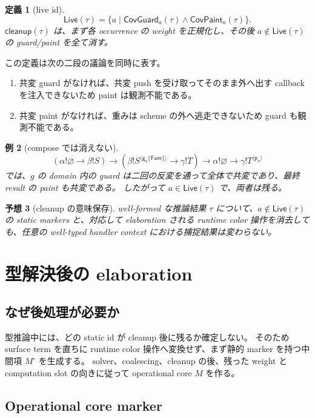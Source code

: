 \documentclass[uplatex,dvipdfmx,a4paper,11pt]{jsarticle}
\theoremstyle{jpplain}
\newtheorem{definition}{定義}[section]
\newtheorem{conjecture}[definition]{予想}
\newtheorem{example}[definition]{例}
\newcommand{\Fam}{\mathsf{Fam}}
\newcommand{\eff}{\mathbin{!}}
\newcommand{\emptyrow}{\varnothing}
\newcommand{\gatom}[2]{\mathsf g_{#1}\!\{#2\}}
\newcommand{\patom}[1]{\mathsf p_{#1}}
\newcommand{\wocc}[2]{#1^{\langle #2\rangle}}
\newcommand{\cleanup}{\mathsf{cleanup}}
\newcommand{\CovG}{\mathsf{CovGuard}}
\newcommand{\CovP}{\mathsf{CovPaint}}
\newcommand{\Live}{\mathsf{Live}}
\begin{document}
\begin{definition}[live id]
\[
  \Live(\tau)=\{a\mid \CovG_a(\tau)\land\CovP_a(\tau)\}.
\]
$\cleanup(\tau)$ は、まず各 occurrence の weight を正規化し、その後
$a\notin\Live(\tau)$ の guard/paint を全て消す。
\end{definition}

この定義は次の二段の議論を同時に表す。
\begin{enumerate}
  \item 共変 guard がなければ、共変 push を受け取ってそのまま外へ出す callback を注入できないため paint は観測不能である。
  \item 共変 paint がなければ、重みは scheme の外へ逃走できないため guard も観測不能である。
\end{enumerate}

\begin{example}[compose では消えない]
\[
 (\alpha\eff\emptyrow\to\beta\eff S)
 \to
 (\beta\eff\wocc S{\gatom a\Fam}\to\gamma\eff T)
 \to
 \alpha\eff\emptyrow\to\gamma\eff\wocc T{\patom a}
\]
では、$g$ の domain 内の guard は二回の反変を通って全体で共変であり、最終 result の paint も共変である。
したがって $a\in\Live(\tau)$ で、両者は残る。
\end{example}

\begin{conjecture}[cleanup の意味保存]
well-formed な推論結果 $\tau$ について、$a\notin\Live(\tau)$ の static markers と、対応して elaboration される
runtime color 操作を消去しても、任意の well-typed handler context における捕捉結果は変わらない。
\end{conjecture}

\section{型解決後の elaboration}

\subsection{なぜ後処理が必要か}

型推論中には、どの static id が cleanup 後に残るか確定しない。
そのため surface term を直ちに runtime color 操作へ変換せず、まず静的 marker を持つ中間項 $M^\circ$ を生成する。
solver、coalescing、cleanup の後、残った weight と computation slot の向きに従って operational core $M$ を作る。

\subsection{Operational core marker}
\end{document}
